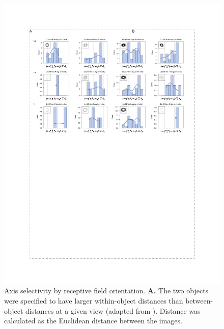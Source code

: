 \begin{figure}[t!]
\includegraphics[width=\textwidth]{figures/supplemental/fig_sX_theta_vs_rf/fig_sX_theta_vs_rf.pdf}
    \vspace{.1in}
    \caption[Receptive field shape and Direction tuning]{Axis selectivity by receptive field orientation.
    \textbf{A.} The two objects were specified to have larger within-object distances than between-object distances at a given view (adapted from \cite{Zoccolan2009}). Distance was calculated as the Euclidean distance between the images. 
    \label{supfig:theta_vs_rf}}
\end{figure}






